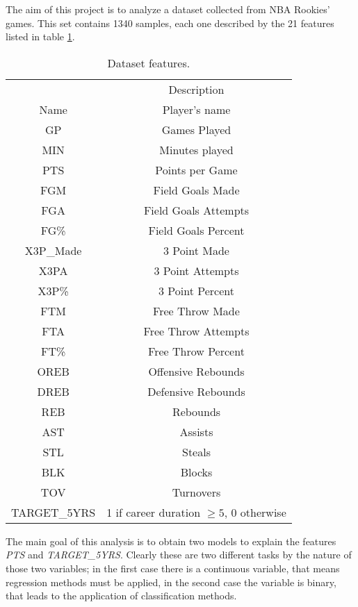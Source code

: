 The aim of this project is to analyze a dataset collected from NBA Rookies' games. This set contains 1340 samples, each one described by the 21 features listed in table \ref{tab:1}.
\begin{table}[h]
	\centering
	\begin{tabular}{||c | c ||} 
		\hline
		& Description\\
		Name & Player's name\\ 
		GP & Games Played\\ 
		MIN & Minutes played\\ 
		PTS & Points per Game\\
		FGM & Field Goals Made\\
		FGA & Field Goals Attempts\\
		FG\% & Field Goals Percent\\
		X3P\_Made & 3 Point Made\\
		X3PA & 3 Point Attempts\\
		X3P\% & 3 Point Percent\\
		FTM & Free Throw Made\\
		FTA & Free Throw Attempts\\
		FT\% & Free Throw Percent\\
		OREB & Offensive Rebounds\\
		DREB & Defensive Rebounds\\
		REB & Rebounds\\
		AST & Assists\\
		STL & Steals\\
		BLK & Blocks\\
		TOV & Turnovers\\
		TARGET\_5YRS & 1 if career duration $\geq 5$, 0 otherwise\\
		\hline
	\end{tabular}
	\caption{Dataset features.}
	\label{tab:1}
\end{table} 

The main goal of this analysis is to obtain two models to explain the features \textit{PTS} and \textit{TARGET\_5YRS}. Clearly these are two different tasks by the nature of those two variables; in the first case there is a continuous variable, that means regression methods must be applied, in the second case the variable is binary, that leads to the application of classification methods.